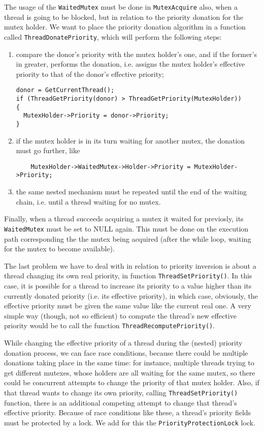 The usage of the \lstinline|WaitedMutex| must be done in \lstinline|MutexAcquire| also, when a thread is going to be blocked, but in relation to the priority donation for the mutex holder. We want to place the priority donation algorithm in a function called \lstinline|ThreadDonatePriority|, which will perform the following steps:
\begin{enumerate}
    \item compare the donor's priority with the mutex holder's one, and if the former's in greater, performs the donation, i.e. assigns the mutex holder's effective priority to that of the donor's effective priority;
    \begin{lstlisting}
donor = GetCurrentThread();
if (ThreadGetPriority(donor) > ThreadGetPriority(MutexHolder))
{
  MutexHolder->Priority = donor->Priority;
}
    \end{lstlisting}

    \item if the mutex holder is in its turn waiting for another mutex, the donation must go further, like
\begin{lstlisting}
    MutexHolder->WaitedMutex->Holder->Priority = MutexHolder->Priority;
\end{lstlisting}

    \item the same nested mechanism must be repeated until the end of the waiting chain, i.e. until a thread waiting for no mutex.
\end{enumerate}

Finally, when a thread succeeds acquiring a mutex it waited for previosly, its \lstinline|WaitedMutex| must be set to NULL again. This must be done on the execution path corresponding the the mutex being acquired (after the while loop, waiting for the mutex to become available).

The last problem we have to deal with in relation to priority inversion is about a thread changing its own real priority, in function \lstinline|ThreadSetPriority()|. In this case, it is possible for a thread to increase its priority to a value higher than its currently donated priority (i.e. its effective priority), in which case, obviously, the effective priority must be given the same value like the current real one. A very simple way (though, not so efficient) to compute the thread's new effective priority would be to call the function \lstinline|ThreadRecomputePriority()|.

While changing the effective priority of a thread during the (nested) priority donation process, we can face race conditions, because there could be multiple donations taking place in the same time: for instance, multiple threads trying to get different mutexes, whose holders are all waiting for the same mutex, so there could be concurrent attempts to change the priority of that mutex holder. Also, if that thread wants to change its own priority, calling \lstinline|ThreadSetPriority()| function, there is an additional competing attempt to change that thread's effective priority. Because of race conditions like these, a thread's priority fields must be protected by a lock. We add for this the \lstinline|PriorityProtectionLock| lock.

